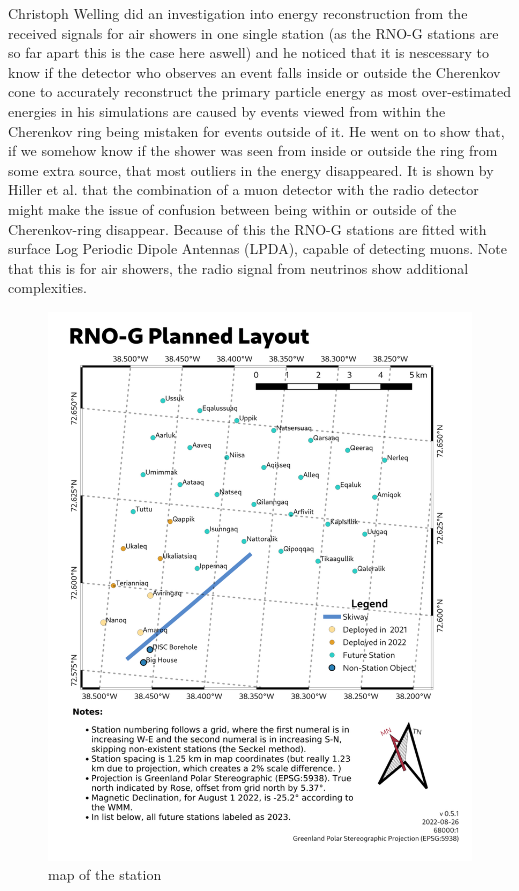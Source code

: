 \documentclass[11pt,a4paper,faculty=we,language=en,doctype=report]{cls/ugent-doc}
\begin{document}
Christoph Welling did an investigation into energy reconstruction from the
received signals\cite{Welling_2019} for air showers in one single station (as
the RNO-G stations are so far apart this is the case here aswell) and he
noticed that it is nescessary to know if the detector who observes an event
falls inside or outside the Cherenkov cone to accurately reconstruct the
primary particle energy as most over-estimated energies in his simulations are
caused by events viewed from within the Cherenkov ring being mistaken for
events outside of it. He went on to show that, if we somehow know if the shower
was seen from inside or outside the ring from some extra source, that most
outliers in the energy disappeared. It is shown by Hiller et
al.\cite{Hiller_2017} that the combination of a muon detector with the radio
detector might make the issue of confusion between being within or outside of
the Cherenkov-ring disappear. Because of this the RNO-G stations are fitted
with surface Log Periodic Dipole Antennas (LPDA), capable of detecting muons.
Note that this is for air showers, the radio signal from neutrinos show
additional complexities.

\begin{figure}
	\includegraphics[width=\textwidth]{figures/station-map.png}	
	\caption{map of the station}
	\label{fig:station map}
\end{figure}
\end{document}
